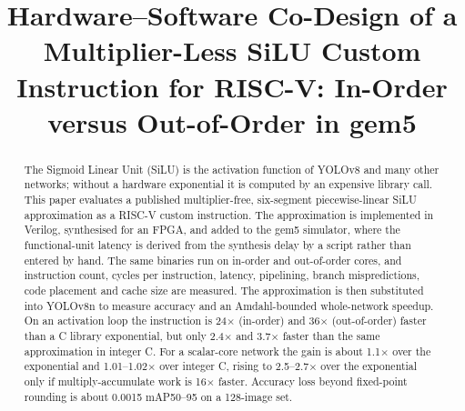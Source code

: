 \documentclass[conference]{IEEEtran}
\begin{document}
\title{Hardware--Software Co-Design of a Multiplier-Less SiLU Custom Instruction for RISC-V: In-Order versus Out-of-Order in gem5}

\author{
\and
{}
\and
{}
\and
{}
\and
{}
}

\maketitle

\begin{abstract}
The Sigmoid Linear Unit (SiLU) is the activation function of YOLOv8 and many other networks; without a hardware exponential it is computed by an expensive library call. This paper evaluates a published multiplier-free, six-segment piecewise-linear SiLU approximation as a RISC-V custom instruction. The approximation is implemented in Verilog, synthesised for an FPGA, and added to the gem5 simulator, where the functional-unit latency is derived from the synthesis delay by a script rather than entered by hand. The same binaries run on in-order and out-of-order cores, and instruction count, cycles per instruction, latency, pipelining, branch mispredictions, code placement and cache size are measured. The approximation is then substituted into YOLOv8n to measure accuracy and an Amdahl-bounded whole-network speedup. On an activation loop the instruction is 24$\times$ (in-order) and 36$\times$ (out-of-order) faster than a C library exponential, but only 2.4$\times$ and 3.7$\times$ faster than the same approximation in integer C. For a scalar-core network the gain is about 1.1$\times$ over the exponential and 1.01--1.02$\times$ over integer C, rising to 2.5--2.7$\times$ over the exponential only if multiply-accumulate work is 16$\times$ faster. Accuracy loss beyond fixed-point rounding is about 0.0015 mAP50--95 on a 128-image set.
\end{abstract}
\end{document}
